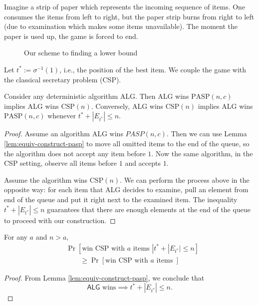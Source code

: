 \begin{intuition}
	Imagine a strip of paper which represents the incoming sequence of items. One consumes the items from left to right, but the paper strip burns from right to left (due to examination which makes some items unavailable). The moment the paper is used up, the game is forced to end.
\end{intuition}
\begin{figure}[ht]
    \centering
    \caption{Our scheme to finding a lower bound}
    \label{fig:lowerbound}
\end{figure}

Let $t^* := \sigma^{-1}(1)$, i.e., the position of the best item. We couple the game with the classical secretary problem (CSP). 

\begin{lemma}
\label{lem:CSP-couple}
	Consider any deterministic algorithm  \textsf{ALG}. Then \textsf{ALG} wins $\text{PASP}(n, c)$ implies  \textsf{ALG} wins $\text{CSP}(n)$. Conversely, \textsf{ALG} wins $\text{CSP}(n)$ implies  \textsf{ALG} wins $\text{PASP}(n, c)$ whenever $t^* + |E_{t^*}| \le n$.
\end{lemma}
\begin{proof}
	Assume an algorithm \textsf{ALG} wins $PASP(n, c)$. Then we can use Lemma \ref{lem:equiv-construct-pasp} to move all omitted items to the end of the queue, so the algorithm does not accept any item before $1$. Now the same algorithm, in the CSP setting, observe all items before $1$ and accepts $1$.

	Assume the algorithm wins  $\text{CSP}(n)$. We can perform the process above in the opposite way: for each item that \textsf{ALG} decides to examine, pull an element from end of the queue and put it right next to the examined item. The inequality $t^* + |E_{t^*}| \le n$ guarantees that there are enough elements at the end of the queue to proceed with our construction.


\end{proof}

\begin{lemma}
	\label{lem:CSP*}
	For any $a$ and $n> a$,
 	\begin{equation*}
		\begin{split}
	&\operatorname{Pr}\left[{\text{win CSP with }a \text{ items } |  t^* +  |E_{t^*}| \le n }\right] \\
	&\qquad \ge \operatorname{Pr}\left[{\text{win CSP with }a \text{ items }}\right]
		\end{split}
 	\end{equation*}  

\end{lemma}
\begin{proof}
	From Lemma \ref{lem:equiv-construct-pasp}, we conclude that
	 \begin{equation}
	 	\mathsf{ALG}\text{ wins} \implies t^* + |E_{t^*}| \le  n
	 .\end{equation} 
\end{proof}

